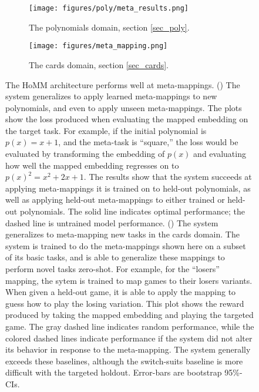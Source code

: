 \documentclass{article}
\begin{document}
\begin{figure}[t]
\centering
\begin{subfigure}{0.5\textwidth}
\texttt{[image: figures/poly/meta\_results.png]}
\caption{The polynomials domain, section \ref{sec_poly}.}
\label{poly_meta_map_results_examples}
\end{subfigure}%
\begin{subfigure}{0.5\textwidth}
\texttt{[image: figures/meta\_mapping.png]}
\caption{The cards domain, section \ref{sec_cards}.}
\label{cards_meta_map_results_examples}
\end{subfigure}%
\caption{The HoMM architecture performs well at meta-mappings. () The system generalizes to apply learned meta-mappings to new polynomials, and even to apply unseen meta-mappings. The plots show the loss produced when evaluating the mapped embedding on the target task. For example, if the initial polynomial is $p(x) = x + 1$, and the meta-task is ``square,'' the loss would be evaluated by transforming the embedding of $p(x)$ and evaluating how well the mapped embedding regresses on to $p(x)^2 = x^2 + 2x + 1$. The results show that the system succeeds at applying meta-mappings it is trained on to held-out polynomials, as well as applying held-out meta-mappings to either trained or held-out polynomials. The solid line indicates optimal performance; the dashed line is untrained model performance.
() The system generalizes to meta-mapping new tasks in the cards domain. The system is trained to do the meta-mappings shown here on a subset of its basic tasks, and is able to generalize these mappings to perform novel tasks zero-shot. For example, for the ``losers'' mapping, the sytem is trained to map games to their losers variants. When given a held-out game, it is able to apply the mapping to guess how to play the losing variation. This plot shows the reward produced by taking the mapped embedding and playing the targeted game. The gray dashed line indicates random performance, while the colored dashed lines indicate performance if the system did not alter its behavior in response to the meta-mapping. The system generally exceeds these baselines, although the switch-suits baseline is more difficult with the targeted holdout. 
Error-bars are bootstrap 95\%-CIs.} 
\label{meta_map_results}
\end{figure}
\end{document}
